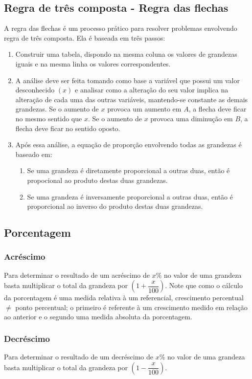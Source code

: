 \documentclass{article}
\begin{document}
\subsection{Regra de três composta - Regra das flechas}
A regra das flechas é um processo prático para resolver problemas envolvendo regra de três composta. Ela é baseada em três passos:
\begin{enumerate}
    \item Construir uma tabela, dispondo na mesma coluna os valores de grandezas iguais e na mesma linha os valores correspondentes.
    \item A análise deve ser feita tomando como base a variável que possui um valor desconhecido $(x)$ e analisar como a alteração do seu valor implica na alteração de cada uma das outras variáveis, mantendo-se constante as demais grandezas. Se o aumento de $x$ provoca um aumento em $A$, a flecha deve ficar no mesmo sentido que $x$. Se o aumento de $x$ provoca uma diminução em $B$, a flecha deve ficar no sentido oposto.
    \item Após essa análise, a equação de proporção envolvendo todas as grandezas é baseado em:
    \begin{enumerate}[\quad i)]
        \item Se uma grandeza é diretamente proporcional a outras duas, então é propocional ao produto destas duas grandezas.
        \item Se uma grandeza é inversamente proporcional a outras duas, então é proporcional ao inverso do produto destas duas grandezas.
    \end{enumerate}
\end{enumerate}

\subsection{Porcentagem}
\subsubsection{Acréscimo}
Para determinar o resultado de um acréscimo de $x\%$ no valor de uma grandeza basta multiplicar o total da grandeza por $\left(1+\dfrac{x}{100}\right)$. Note que como o cálculo da porcentagem é uma medida relativa à um referencial, crescimento percentual $\neq$ ponto percentual; o primeiro é referente à um crescimento medido em relação ao anterior e o segundo uma medida absoluta da porcentagem.
\subsubsection{Decréscimo}
Para determinar o resultado de um decréscimo de $x\%$ no valor de uma grandeza basta multiplicar o total da grandeza por $\left(1-\dfrac{x}{100}\right)$.
\end{document}
